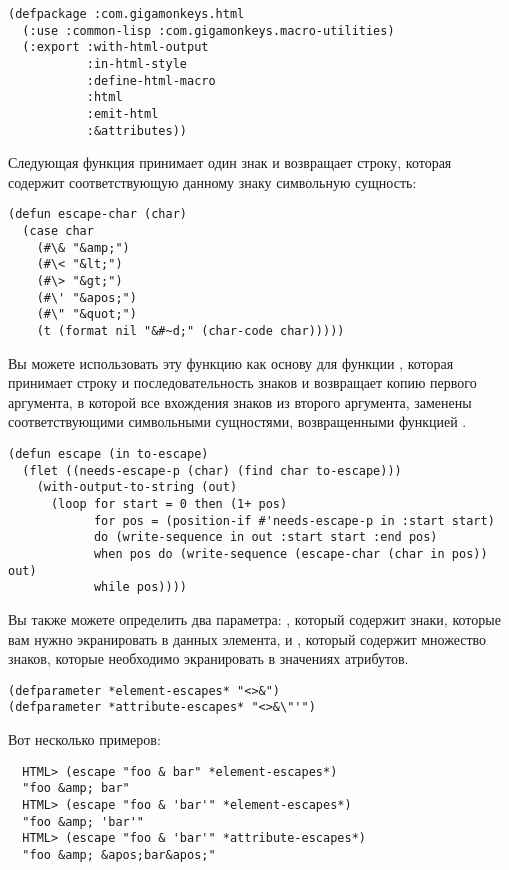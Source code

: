 \begin{lstlisting}
(defpackage :com.gigamonkeys.html
  (:use :common-lisp :com.gigamonkeys.macro-utilities)
  (:export :with-html-output
           :in-html-style
           :define-html-macro
           :html
           :emit-html
           :&attributes))
\end{lstlisting}


Следующая функция принимает один знак и возвращает строку, которая содержит
соответствующую данному знаку символьную сущность:

\begin{lstlisting}
(defun escape-char (char)
  (case char
    (#\& "&amp;")
    (#\< "&lt;")
    (#\> "&gt;")
    (#\' "&apos;")
    (#\" "&quot;")
    (t (format nil "&#~d;" (char-code char)))))
\end{lstlisting}

Вы можете использовать эту функцию как основу для функции , которая принимает
строку и последовательность знаков и возвращает копию первого аргумента, в которой все
вхождения знаков из второго аргумента, заменены соответствующими символьными сущностями,
возвращенными функцией .

\begin{lstlisting}
(defun escape (in to-escape)
  (flet ((needs-escape-p (char) (find char to-escape)))
    (with-output-to-string (out)
      (loop for start = 0 then (1+ pos)
            for pos = (position-if #'needs-escape-p in :start start)
            do (write-sequence in out :start start :end pos)
            when pos do (write-sequence (escape-char (char in pos)) out)
            while pos))))
\end{lstlisting}

Вы также можете определить два параметра: , который содержит
знаки, которые вам нужно экранировать в данных элемента, и ,
который содержит множество знаков, которые необходимо экранировать в значениях атрибутов.

\begin{lstlisting}
(defparameter *element-escapes* "<>&")
(defparameter *attribute-escapes* "<>&\"'")
\end{lstlisting}

Вот несколько примеров:

\begin{verbatim}
  HTML> (escape "foo & bar" *element-escapes*)
  "foo &amp; bar"
  HTML> (escape "foo & 'bar'" *element-escapes*)
  "foo &amp; 'bar'"
  HTML> (escape "foo & 'bar'" *attribute-escapes*)
  "foo &amp; &apos;bar&apos;"
\end{verbatim}

